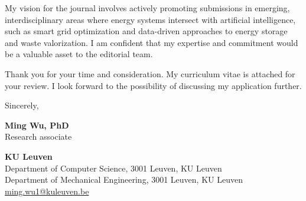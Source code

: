 \documentclass[a4paper,9pt]{article}
\begin{document}
My vision for the journal involves actively promoting submissions in emerging, interdisciplinary areas where energy systems intersect with artificial intelligence, such as smart grid optimization and data-driven approaches to energy storage and waste valorization. I am confident that my expertise and commitment would be a valuable asset to the editorial team.

Thank you for your time and consideration. My curriculum vitae is attached for your review. I look forward to the possibility of discussing my application further.


\vspace{0.5cm}
Sincerely,

\vspace{0cm}
\textcolor{KULBlue_D}{\textbf{Ming Wu, PhD}}\\
\textcolor{KULBlue_C}{Research associate}

\vspace{0cm}
\color{KULBlue_D}
\textbf{KU Leuven}\\
\color{KULBlue_C}
Department of Computer Science, 3001 Leuven, KU Leuven\\
Department of Mechanical Engineering, 3001 Leuven, KU Leuven\\
\underline{\textcolor{KULBlue_D}{ming.wu1@kuleuven.be}}
\color{black}
% 
% 
\end{document}

